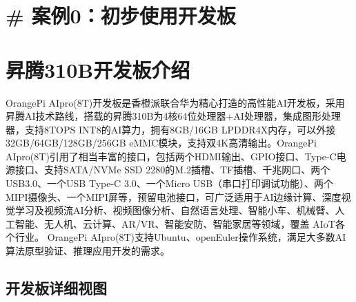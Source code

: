 \section{\#
案例0：初步使用开发板}\label{ux6848ux4f8b0ux521dux6b65ux4f7fux7528ux5f00ux53d1ux677f}

\section{昇腾310B开发板介绍}\label{ux6607ux817e310bux5f00ux53d1ux677fux4ecbux7ecd}

OrangePi
AIpro(8T)开发板是香橙派联合华为精心打造的高性能AI开发板，采用昇腾AI技术路线，搭载的昇腾310B为4核64位处理器+AI处理器，集成图形处理器，支持8TOPS
INT8的AI算力，拥有8GB/16GB LPDDR4X内存，可以外接32GB/64GB/128GB/256GB
eMMC模块，支持双4K高清输出。OrangePi
AIpro(8T)引用了相当丰富的接口，包括两个HDMI输出、GPIO接口、Type-C电源接口、支持SATA/NVMe
SSD 2280的M.2插槽、TF插槽、千兆网口、两个USB3.0、一个USB Type-C
3.0、一个Micro
USB（串口打印调试功能）、两个MIPI摄像头、一个MIPI屏等，预留电池接口，可广泛适用于AI边缘计算、深度视觉学习及视频流AI分析、视频图像分析、自然语言处理、智能小车、机械臂、人工智能、无人机、云计算、AR/VR、智能安防、智能家居等领域，覆盖
AIoT各个行业。 OrangePi
AIpro(8T)支持Ubuntu、openEuler操作系统，满足大多数AI算法原型验证、推理应用开发的需求。

\subsection{开发板详细视图}\label{ux5f00ux53d1ux677fux8be6ux7ec6ux89c6ux56fe}

